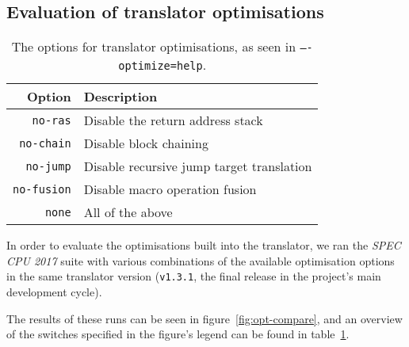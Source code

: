 


\subsection{Evaluation of translator optimisations}
\begin{table}
	\centering
	\begin{tabular}{rl}
		\toprule
		\textbf{Option} & \textbf{Description}\\
		\midrule
		\texttt{no-ras} & Disable the return address stack\\
		\texttt{no-chain} & Disable block chaining\\
		\texttt{no-jump} & Disable recursive jump target translation\\
		\texttt{no-fusion} & Disable macro operation fusion\\
		\texttt{none} & All of the above\\
		\bottomrule
	\end{tabular}
	\caption[Translator optimisation options]%
	{The options for translator optimisations, as seen in \texttt{----optimize=help}.}
	\label{tab:opt-options}
\end{table}

In order to evaluate the optimisations built into the translator, we ran the \textit{SPEC CPU 2017} suite with various combinations of the available optimisation options in the same translator version (\texttt{v1.3.1}, the final release in the project's main development cycle).

The results of these runs can be seen in figure~\ref{fig:opt-compare}, and an overview of the switches specified in the figure's legend can be found in table~\ref{tab:opt-options}.


\basetable
{}\norastable
{}\nofusiontable
{}\nojumpnorastable
{}\nonetable

\basetable
{}\basetable

